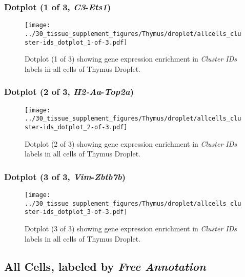 \clearpage

\subsubsection{Dotplot (1 of 3, \emph{C3}-\emph{Ets1})}
\begin{figure}[h]
\centering
\texttt{[image: ../30\_tissue\_supplement\_figures/Thymus/droplet/allcells\_cluster-ids\_dotplot\_1-of-3.pdf]}

\caption{ Dotplot (1 of 3)  showing gene expression enrichment in \emph{Cluster IDs} labels in all cells of Thymus Droplet. }
\end{figure}


\clearpage

\subsubsection{Dotplot (2 of 3, \emph{H2-Aa}-\emph{Top2a})}
\begin{figure}[h]
\centering
\texttt{[image: ../30\_tissue\_supplement\_figures/Thymus/droplet/allcells\_cluster-ids\_dotplot\_2-of-3.pdf]}

\caption{ Dotplot (2 of 3)  showing gene expression enrichment in \emph{Cluster IDs} labels in all cells of Thymus Droplet. }
\end{figure}


\clearpage

\subsubsection{Dotplot (3 of 3, \emph{Vim}-\emph{Zbtb7b})}
\begin{figure}[h]
\centering
\texttt{[image: ../30\_tissue\_supplement\_figures/Thymus/droplet/allcells\_cluster-ids\_dotplot\_3-of-3.pdf]}

\caption{ Dotplot (3 of 3)  showing gene expression enrichment in \emph{Cluster IDs} labels in all cells of Thymus Droplet. }
\end{figure}


\clearpage

\subsection{All Cells, labeled by \emph{Free Annotation}}
